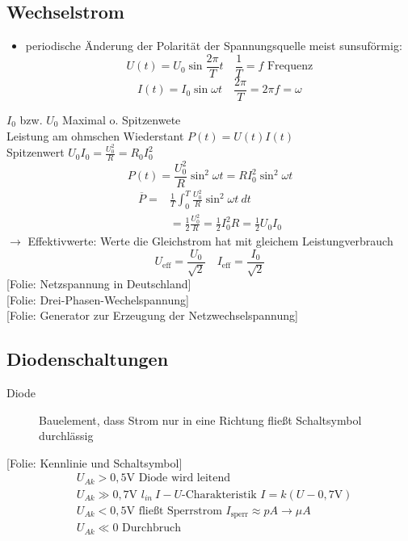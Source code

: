 \documentclass[titlepage,12pt,a4paper,ngerman]{report}
\newcommand{\tx}[1]{\textrm{#1}}
\newcommand{\folie}[1]{\color{gray}[Folie: #1]\color{black}}
\begin{document}
\subsection{Wechselstrom}
\begin{itemize}
	\item periodische Änderung der Polarität der Spannungsquelle meist sunsuförmig: 
	$$U(t) = U_0 \sin \frac{2 \pi}{T}t \quad \frac{1}{T} = f \tx{ Frequenz}$$ 
	$$I(t) = I_0 \sin \omega t \quad \frac{2 \pi}{T}= 2 \pi f = \omega$$
\end{itemize}
$I_0$ bzw. $U_0$ Maximal o. Spitzenwete\\
Leistung am ohmschen Wiederstant $P(t) = U(t) I(t)$\\
Spitzenwert $U_0 I_0 = \frac{U_0^2}{R}= R_0 I_0^2$ 
$$P(t) = \frac{U_0^2}{R} \sin^2 \omega t = R I_0^2 \sin^2 \omega t$$
\begin{align*}
\overline{P} =& \frac{1}{T} \int_0^T \frac{U_0^2}{R} \sin^2 \omega t\ dt\\
&= \frac{1}{2}\frac{U_0^2}{R} = \frac{1}{2}I_0^2 R = \frac{1}{2}U_0 I_0
\end{align*}
$\rightarrow$ Effektivwerte: Werte die Gleichstrom hat mit gleichem Leistungverbrauch
$$U_{\tx{eff}} = \frac{U_0}{\sqrt{2}} \quad I_{\tx{eff}} = \frac{I_0}{\sqrt{2}}$$
\folie{Netzspannung in Deutschland}\\
\folie{Drei-Phasen-Wechelspannung}\\
\folie{Generator zur Erzeugung der Netzwechselspannung}

\subsection{Diodenschaltungen}
\begin{description}
	\item [Diode] Bauelement, dass Strom nur in eine Richtung fließt Schaltsymbol %
	durchlässig
\end{description}
\folie{Kennlinie und Schaltsymbol}
\begin{align*}
&U_{Ak} > 0,5 \tx{V  Diode wird leitend}\\
&U_{Ak} \gg 0,7 \tx{V  }l_{in}\ I-U\tx{-Charakteristik }I = k (U-0,7\tx{V})\\
&U_{Ak} < 0,5 \tx{V  fließt Sperrstrom } I_{\tx{sperr}} \approx pA \rightarrow \mu A\\
&U_{Ak} \ll 0 \tx{ Durchbruch} 
\end{align*}
\end{document}
